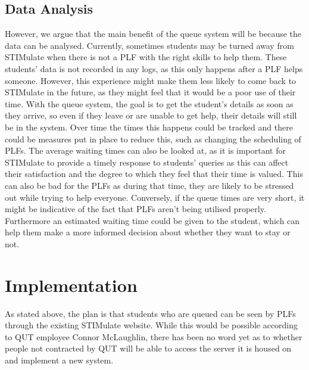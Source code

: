 \documentclass{article}
\begin{document}
	\subsection{Data Analysis}
However, we argue that the main benefit of the queue system will be because the data can be analysed. Currently, sometimes students may be turned away from STIMulate when there is not a PLF with the right skills to help them. These students' data is not recorded in any logs, as this only happens after a PLF helps someone.  However, this experience might make them less likely to come back to STIMulate in the future, as they might feel that it would be a poor use of their time. 
	\newline
	\newline
With the queue system, the goal is to get the student's details as soon as they arrive, so even if they leave or are unable to get help, their details will still be in the system. Over time the times this happens could be tracked and there could be measures put in place to reduce this, such as changing the scheduling of PLFs.
	\newline
	\newline
The average waiting times can also be looked at, as it is important for STIMulate to provide a timely response to students’ queries as this can affect their satisfaction and the degree to which they feel that their time is valued.  This can also be bad for the PLFs as during that time, they are likely to be stressed out while trying to help everyone. Conversely, if the queue times are very short, it might be indicative of the fact that PLFs aren’t being utilised properly. 
	\newline
	\newline
Furthermore an estimated waiting time could be given to the student, which can help them make a more informed decision about whether they want to stay or not. 
\section{Implementation}
As stated above, the plan is that students who are queued can be seen by PLFs through the existing STIMulate website. While this would be possible according to QUT employee Connor McLaughlin, there has been no word yet as to whether people not contracted by QUT will be able to access the server it is housed on and implement a new system. 
\end{document}
